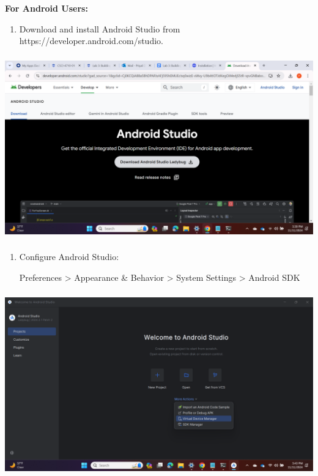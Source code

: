 \documentclass{article}
\begin{document}
\textbf{For Android Users:}
\begin{enumerate}
    \item Download and install Android Studio from  {https://developer.android.com/studio}.
\end{enumerate}
\includegraphics[width=5.57813in,height=3.13391in]{media/image26.png}
    
\begin{enumerate}
    \item Configure Android Studio:
    
        Preferences > Appearance \& Behavior > System Settings > Android SDK
\end{enumerate}
\includegraphics[width=5.57813in,height=3.13391in]{media/image24.png}
    
\end{document}
